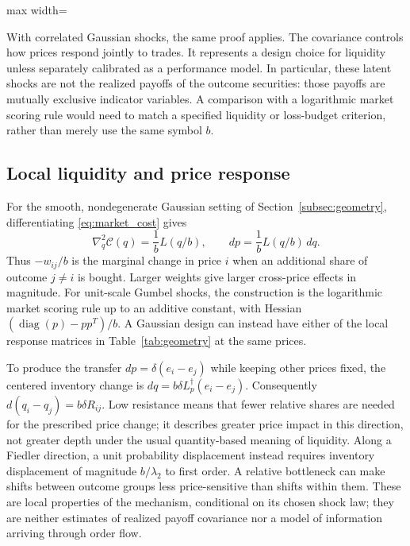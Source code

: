 \documentclass[11pt]{amsart}
\newcommand{\diag}{\operatorname{diag}}
\theoremstyle{definition}
\begin{document}
\begin{table}[ht]
\centering
\caption{A Gaussian market maker with three outcomes and $b=10$. Revenue and loss are in the security's unit of account.}\label{tab:market}
\begin{adjustbox}{max width=\textwidth}\end{adjustbox}
\end{table}

With correlated Gaussian shocks, the same proof applies. The covariance controls how prices respond jointly to trades. It represents a design choice for liquidity unless separately calibrated as a performance model. In particular, these latent shocks are not the realized payoffs of the outcome securities: those payoffs are mutually exclusive indicator variables. A comparison with a logarithmic market scoring rule would need to match a specified liquidity or loss-budget criterion, rather than merely use the same symbol $b$.

\subsection{Local liquidity and price response}\label{subsec:liquidity}
For the smooth, nondegenerate Gaussian setting of Section~\ref{subsec:geometry},
differentiating \eqref{eq:market_cost} gives
\begin{equation}\label{eq:market_hessian}
 \nabla_q^2\mathcal C(q)=\frac1bL(q/b),\qquad
 dp=\frac1bL(q/b)\,dq.
\end{equation}
Thus $-w_{ij}/b$ is the marginal change in price $i$ when an additional share
of outcome $j\ne i$ is bought. Larger weights give larger cross-price
effects in magnitude. For unit-scale Gumbel shocks, the construction is the
logarithmic market scoring rule up to an additive constant, with Hessian
$(\diag(p)-pp^T)/b$. A Gaussian design can instead have either of the
local response matrices in Table~\ref{tab:geometry} at the same prices.

To produce the transfer $dp=\delta(e_i-e_j)$ while keeping other prices fixed,
the centered inventory change is
$dq=b\delta L_p^\dagger(e_i-e_j)$. Consequently
$d(q_i-q_j)=b\delta R_{ij}$. Low resistance means that fewer relative shares
are needed for the prescribed price change; it describes greater price
impact in this direction, not greater depth under the usual quantity-based
meaning of liquidity. Along a Fiedler direction, a unit probability
displacement instead requires inventory displacement of magnitude
$b/\lambda_2$ to first order. A relative bottleneck can make shifts between
outcome groups less price-sensitive than shifts within them. These are local
properties of the mechanism, conditional on its chosen shock law; they are
neither estimates of realized payoff covariance nor a model of information
arriving through order flow.
\end{document}
